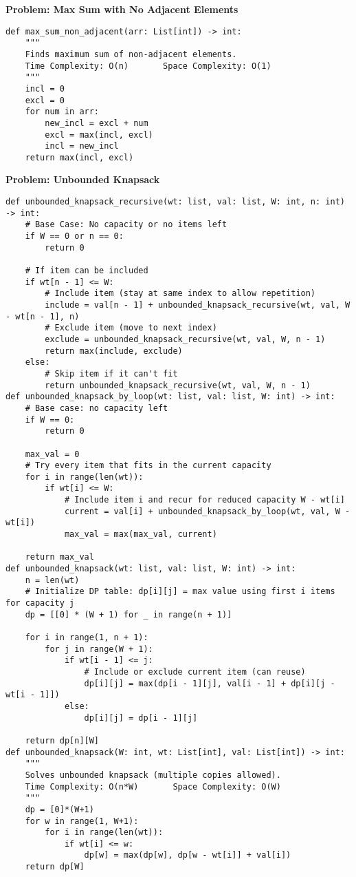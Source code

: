 \noindent\textbf{Problem: Max Sum with No Adjacent Elements}
\begin{verbatim}
def max_sum_non_adjacent(arr: List[int]) -> int:
    """
    Finds maximum sum of non-adjacent elements.
    Time Complexity: O(n)       Space Complexity: O(1)
    """
    incl = 0
    excl = 0
    for num in arr:
        new_incl = excl + num
        excl = max(incl, excl)
        incl = new_incl
    return max(incl, excl)
\end{verbatim}
\noindent\textbf{Problem: Unbounded Knapsack}
\begin{verbatim}
def unbounded_knapsack_recursive(wt: list, val: list, W: int, n: int) -> int:
    # Base Case: No capacity or no items left
    if W == 0 or n == 0:
        return 0

    # If item can be included
    if wt[n - 1] <= W:
        # Include item (stay at same index to allow repetition)
        include = val[n - 1] + unbounded_knapsack_recursive(wt, val, W - wt[n - 1], n)
        # Exclude item (move to next index)
        exclude = unbounded_knapsack_recursive(wt, val, W, n - 1)
        return max(include, exclude)
    else:
        # Skip item if it can't fit
        return unbounded_knapsack_recursive(wt, val, W, n - 1)
def unbounded_knapsack_by_loop(wt: list, val: list, W: int) -> int:
    # Base case: no capacity left
    if W == 0:
        return 0

    max_val = 0
    # Try every item that fits in the current capacity
    for i in range(len(wt)):
        if wt[i] <= W:
            # Include item i and recur for reduced capacity W - wt[i]
            current = val[i] + unbounded_knapsack_by_loop(wt, val, W - wt[i])
            max_val = max(max_val, current)

    return max_val
def unbounded_knapsack(wt: list, val: list, W: int) -> int:
    n = len(wt)
    # Initialize DP table: dp[i][j] = max value using first i items for capacity j
    dp = [[0] * (W + 1) for _ in range(n + 1)]

    for i in range(1, n + 1):
        for j in range(W + 1):
            if wt[i - 1] <= j:
                # Include or exclude current item (can reuse)
                dp[i][j] = max(dp[i - 1][j], val[i - 1] + dp[i][j - wt[i - 1]])
            else:
                dp[i][j] = dp[i - 1][j]

    return dp[n][W]
def unbounded_knapsack(W: int, wt: List[int], val: List[int]) -> int:
    """
    Solves unbounded knapsack (multiple copies allowed).
    Time Complexity: O(n*W)       Space Complexity: O(W)
    """
    dp = [0]*(W+1)
    for w in range(1, W+1):
        for i in range(len(wt)):
            if wt[i] <= w:
                dp[w] = max(dp[w], dp[w - wt[i]] + val[i])
    return dp[W]
\end{verbatim}

